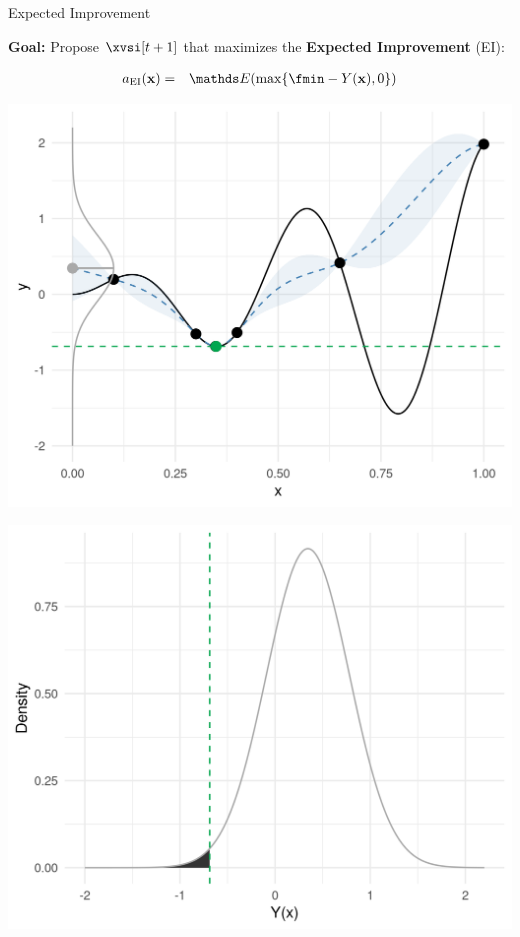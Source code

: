 \documentclass[11pt,compress,t,notes=noshow, xcolor=table]{beamer}
\begin{document}
\begin{frame}{Expected Improvement}

\textbf{Goal:} Propose $\xvsi[t+1]$ that maximizes the \textbf{Expected Improvement} (EI): 

\vspace*{-0.5cm}

\begin{eqnarray*}
  a_{\text{EI}}(\xv) &=& \E(\max\{\fmin - Y(\xv), 0\}) \\
\end{eqnarray*} 

\vspace*{-0.5cm}

\begin{minipage}[b]{0.40\textwidth}
  \includegraphics[width = \textwidth]{figure_man/bayesian_loop_sm_normal_fmin.png}
\end{minipage}
\hfill
\begin{minipage}[b]{0.40\textwidth}
  \includegraphics[width = \textwidth]{figure_man/bayesian_loop_pi_0.png}
\end{minipage}


\end{frame}
\end{document}
